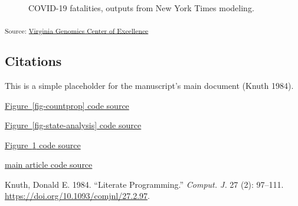 \documentclass[
  twocolumn]{article}
\newlength{\cslhangindent}
\newenvironment{CSLReferences}[2] %
 {\begin{list}{}{%
  \setlength{\itemindent}{0pt}
  \setlength{\leftmargin}{0pt}
  \setlength{\parsep}{0pt}
  \ifodd #1
   \setlength{\leftmargin}{\cslhangindent}
   \setlength{\itemindent}{-1\cslhangindent}
  \fi
  \setlength{\itemsep}{#2\baselineskip}}}
 {\end{list}}
\begin{document}
\begin{figure}[H]


\caption{\label{fig-fatality-plot}COVID-19 fatalities, outputs from New
York Times modeling.}

\end{figure}%

\textsubscript{Source:
\href{https://coe-test-org.github.io/sitrep-demo/notebooks/vacoe-preview.html\#cell-fig-fatality-plot}{Virginia
Genomics Center of Excellence}}

\subsection{Citations}\label{citations}

This is a simple placeholder for the manuscript's main document (Knuth
1984).

\href{https://coe-test-org.github.io/sitrep-demo/notebooks/nwcoe-preview.html\#cell-fig-countprop}{Figure~\ref{fig-countprop}
code source}

\href{https://coe-test-org.github.io/sitrep-demo/notebooks/necoe-preview.html\#cell-fig-state-analysis}{Figure~\ref{fig-state-analysis}
code source}

\href{https://coe-test-org.github.io/sitrep-demo/notebooks/vacoe-preview.html\#cell-fig-fatality-plot}{Figure~\ref{fig-fatality-plot}
code source}

\href{https://coe-test-org.github.io/sitrep-demo/notebooks/vacoe-preview.html\#cell-fig-fatality-plot}{main
article code source}

\label{refs}
\begin{CSLReferences}{1}{0}
Knuth, Donald E. 1984. {``Literate Programming.''} \emph{Comput. J.} 27
(2): 97--111. \url{https://doi.org/10.1093/comjnl/27.2.97}.

\end{CSLReferences}
\end{document}
